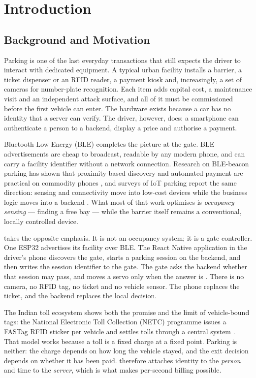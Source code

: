 \chapter{Introduction}

\section{Background and Motivation}

Parking is one of the last everyday transactions that still expects the driver to
interact with dedicated equipment. A typical urban facility installs a barrier, a
ticket dispenser or an RFID reader, a payment kiosk and, increasingly, a set of
cameras for number-plate recognition. Each item adds capital cost, a maintenance
visit and an independent attack surface, and all of it must be commissioned before
the first vehicle can enter. The hardware exists because a car has no identity that
a server can verify. The driver, however, does: a smartphone can authenticate a
person to a backend, display a price and authorise a payment.

Bluetooth Low Energy (BLE) completes the picture at the gate. BLE advertisements
are cheap to broadcast, readable by any modern phone, and can carry a facility
identifier without a network connection. Research on BLE-beacon parking has shown
that proximity-based discovery and automated payment are practical on commodity
phones \cite{mackey2020}, and surveys of IoT parking report the same direction:
sensing and connectivity move into low-cost devices while the business logic moves
into a backend \cite{alam2023,biyik2021}. What most of that work optimises is
\emph{occupancy sensing} --- finding a free bay --- while the barrier itself remains
a conventional, locally controlled device.

\project{} takes the opposite emphasis. It is not an occupancy system; it is a gate
controller. One ESP32 advertises its facility over BLE. The React Native
application in the driver's phone discovers the gate, starts a parking session on
the backend, and then writes the session identifier to the gate. The gate asks the
backend whether that session may pass, and moves a servo only when the answer is
. There is no camera, no RFID tag, no ticket and no vehicle sensor. The
phone replaces the ticket, and the backend replaces the local decision.

The Indian toll ecosystem shows both the promise and the limit of vehicle-bound
tags: the National Electronic Toll Collection (NETC) programme issues a FASTag
RFID sticker per vehicle and settles tolls through a central system
\cite{npci2024}. That model works because a toll is a fixed charge at a fixed
point. Parking is neither: the charge depends on how long the vehicle stayed, and
the exit decision depends on whether it has been paid. \project{} therefore attaches
identity to the \emph{person} and time to the \emph{server}, which is what makes
per-second billing possible.

